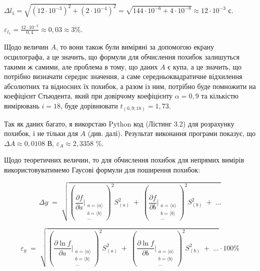 \documentclass[12pt,a4paper]{article}
\begin{document}
    $\displaystyle \Delta l_1 = \sqrt{\left( 12 \cdot 10^{-3}\right)^2 + \left(2 \cdot 10^{-4}\right)^2} = \sqrt{144 \cdot 10^{-6} + 4 \cdot 10^{-8}} \approx 12 \cdot 10^{-3}$ с.

    $\displaystyle \varepsilon_{l_1} = \frac{12 \cdot 10^{-3}}{0,4} \approx 0,03 \approx 3\%$.

    \vspace{1em} %

    Щодо величин $A$, то вони також були виміряні за допомогою екрану осцилографа, а це значить, що формули для обчислення похибок залишуться такими ж самими, але проблема в тому, що
    даних $A$ є купа, а це значить, що потрібно визначати середнє значення, а саме середньоквадратичне відхилення абсолютних та відносних їх похибок, а разом із ним, потрібно буде помножити на коефіцієнт
    Стьюдента, який при довірчому коефіцієнту $\alpha = 0,9$ та кількістю вимірювань $i = 18$, буде дорівнювати $t_{(0,9; 18)} = 1,73$.

    Так як даних багато, я викорстаю Python код (Лістинг 3.2) для розрахунку похибок, і не тільки для $A$ (див. далі). Результат виконання програми показує, що $\Delta A \approx 0,0108$ В, $\varepsilon_{A} \approx 2,3358$ \%.

    Щодо теоретичних величин, то для обчислення похибок для непрямих вимірів використовуватимемо Гаусові формули для поширення похибок:

    \[
        \Delta y \;=\;
        \sqrt{
        \left(
            \frac{\partial f}{\partial a}\Bigg|_{\substack{a=\langle a\rangle \\ b=\langle b\rangle \\ \dots}}
        \right)^{2} S_{(a)}^{2}
        \;+\;
        \left(
            \frac{\partial f}{\partial b}\Bigg|_{\substack{a=\langle a\rangle \\ b=\langle b\rangle \\ \dots}}
        \right)^{2} S_{(b)}^{2}
        \;+\;\dots
        }
    \]

    \[
        \varepsilon_y \;=\;
        \sqrt{
        \left(
            \frac{\partial \ln f}{\partial a}\Bigg|_{\substack{a=\langle a\rangle \\ b=\langle b\rangle \\ \dots}}
        \right)^{2} S_{(a)}^{2}
        \;+\;
        \left(
            \frac{\partial \ln f}{\partial b}\Bigg|_{\substack{a=\langle a\rangle \\ b=\langle b\rangle \\ \dots}}
        \right)^{2} S_{(b)}^{2}
        \;+\;\dots
        } \cdot 100 \%
    \]
\end{document}
